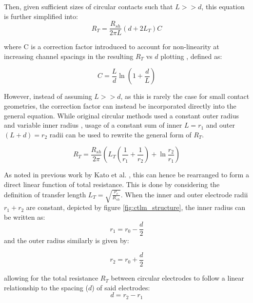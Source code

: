 \begin{refsection}
Then, given sufficient sizes of circular contacts such that $L>>d$, this equation is further simplified into:
\begin{equation}
    \label{eq:ctlm_approx}
    R_{T} = \frac{R_{sh}}{2\pi L} (d + 2L_{T})C
\end{equation}

where C is a correction factor introduced to account for non-linearity at increasing channel spacings in the resulting $R_{T}$ vs $d$ plotting \cite{Colvin1998}, defined as:

\begin{equation}
    C = \frac{L}{d} \ln \left(1 + \frac{d}{L}\right)
\end{equation}

However, instead of assuming $L>>d$, as this is rarely the case for small contact geometries, the correction factor can instead be incorporated directly into the general equation. While original circular methods used a constant outer radius and variable inner radius \cite{Schroder2006-sx, Klootwijk}, usage of a constant sum of inner $L=r_{1}$ and outer $(L+d)=r_{2}$ radii can be used to rewrite the general form of $R_{T}$.

\begin{equation}
    R_{T} = \frac{R_{sh}}{2\pi} \left(L_{T}\left(\frac{1}{r_{1}}+\frac{1}{r_{2}}\right)+\ln{\frac{r_{2}}{r_{1}}}\right)
    \label{eq:ctlm_theory}
\end{equation}

As noted in previous work by Kato et al. \cite{Kato2008, kato2009}, this can hence be rearranged to form a direct linear function of total resistance. This is done by considering the definition of transfer length $L_{T}=\sqrt{\frac{\rho_{c}}{R_{sh}}}$. When the inner and outer electrode radii $r_{1}+r_{2}$ are constant, depicted by figure \ref{fig:ctlm_structure}, the inner radius can be written as:
\begin{equation}
    r_{1} = r_{0} - \frac{d}{2}
\end{equation}
and the outer radius similarly is given by:

\begin{equation}
    r_{2} = r_{0} + \frac{d}{2}
\end{equation}

allowing for the total resistance $R_{T}$ between circular electrodes to follow a linear relationship to the spacing ($d$) of said electrodes:
\begin{equation}
    d = r_{2} - r_{1}
\end{equation}


\end{refsection}
